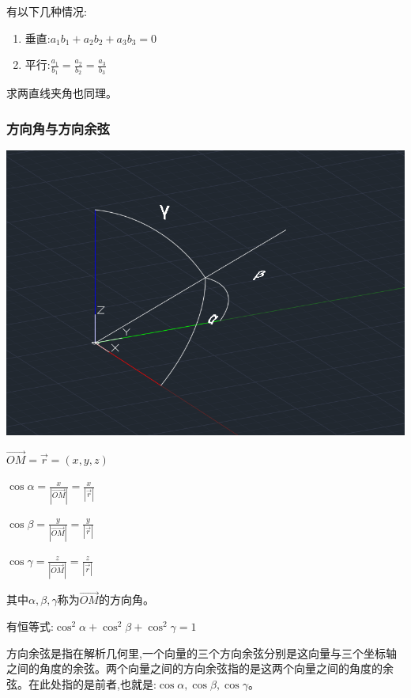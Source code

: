 \documentclass[UTF8]{ctexbook}
\begin{document}
{{{{\begin{itemize}
{              有以下几种情况:
              \begin{enumerate}
                \item 垂直:$a_1b_1 + a_2b_2 + a_3b_3 = 0$
                \item 平行:$\frac{a_1}{b_1} = \frac{a_2}{b_2} = \frac{a_3}{b_3}$
              \end{enumerate}

              求两直线夹角也同理。
              }
      \end{itemize}
    }%

    \subsubsection{方向角与方向余弦}{
      \includegraphics[scale = 0.5]{resources/directionAngle.png}

      $\vec{OM} = \vec{r} = (x,y,z)$

      $\cos\alpha = \frac{x}{|\vec{OM}|} = \frac{x}{|\vec{r}|}$

      $\cos\beta = \frac{y}{|\vec{OM}|} = \frac{y}{|\vec{r}|}$

      $\cos\gamma = \frac{z}{|\vec{OM}|} = \frac{z}{|\vec{r}|}$

      其中$\alpha,\beta,\gamma$称为$\vec{OM}$的方向角。

      有恒等式:$\cos^2\alpha + \cos^2\beta + \cos^2\gamma = 1$

      方向余弦是指在解析几何里,一个向量的三个方向余弦分别是这向量与三个坐标轴之间的角度的余弦。两个向量之间的方向余弦指的是这两个向量之间的角度的余弦。在此处指的是前者,也就是:$\cos\alpha,\cos\beta,\cos\gamma$。

}}}}
\end{document}

